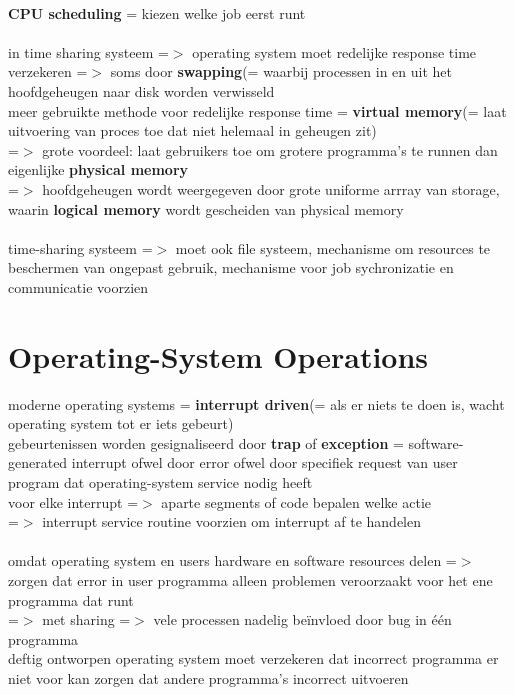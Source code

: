 \documentclass{report}
\begin{document}
\\\textbf{CPU scheduling} = kiezen welke job eerst runt 
\\
\\in time sharing systeem =$>$ operating system moet redelijke response time verzekeren =$>$ soms door \textbf{swapping}(= waarbij processen in en uit het hoofdgeheugen naar disk worden verwisseld
\\meer gebruikte methode voor redelijke response time = \textbf{virtual memory}(= laat uitvoering van proces toe dat niet helemaal in geheugen zit)
\\=$>$ grote voordeel: laat gebruikers toe om grotere programma's te runnen dan eigenlijke \textbf{physical memory}
\\=$>$ hoofdgeheugen wordt weergegeven door grote uniforme arrray van storage, waarin \textbf{logical memory} wordt gescheiden van physical memory
\\
\\time-sharing systeem =$>$ moet ook file systeem, mechanisme om resources te beschermen van ongepast gebruik, mechanisme voor job sychronizatie en communicatie voorzien

\section{Operating-System Operations}
moderne operating systems = \textbf{interrupt driven}(= als er niets te doen is, wacht operating system tot er iets gebeurt)
\\gebeurtenissen worden gesignaliseerd door \textbf{trap} of \textbf{exception} = software-generated interrupt ofwel door error ofwel door specifiek request van user program dat operating-system service nodig heeft
\\voor elke interrupt =$>$ aparte segments of code bepalen welke actie 
\\=$>$ interrupt service routine voorzien om interrupt af te handelen
\\
\\omdat operating system en users hardware en software resources delen =$>$ zorgen dat error in user programma alleen problemen veroorzaakt voor het ene programma dat runt
\\=$>$ met sharing =$>$ vele processen nadelig be\"invloed door bug in \'e\'en programma 
\\ deftig ontworpen operating system moet verzekeren dat incorrect programma er niet voor kan zorgen dat andere programma's incorrect uitvoeren
\end{document}

